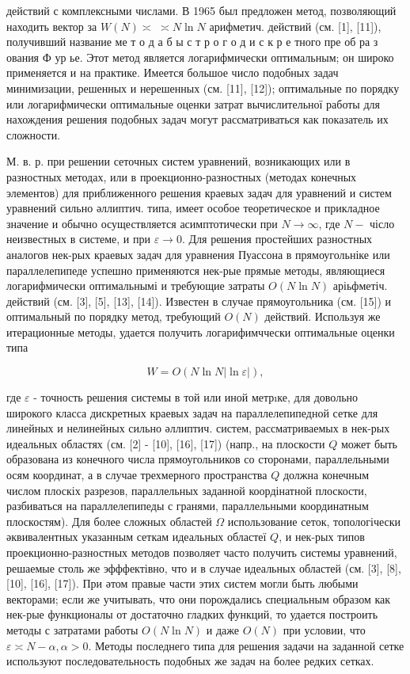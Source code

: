 \documentclass[10pt]{article}
\begin{document}
действий с комплексными числами. В 1965 был предложен метод, позволяющий находить вектор за $W(N) \asymp$ $\asymp N \ln N$ арифметич. действий (см. [1], [11]), получивший название ме т о д а б ы с т р о г о д и с к р е тного пре об ра з ования Ф ур ье. Этот метод является логарифмически оптимальным; он широко применяется и на практике. Имеется большое число подобных задач минимизации, решенных и нерешенных (см. [11], [12]); оптимальные по порядку или логарифмически оптимальные оценки затрат вычислительної работы для нахождения решения подобных задач могут рассматриваться как показатель их сложности.



М. в. р. при решении сеточных систем уравнений, возникающих или в разностных методах, или в проекционно-разностных (методах конечных элементов) для приближенного решения краевых задач для уравнений и систем уравнений сильно әллиптич. типа, имеет особое теоретическое и прикладное значение и обычно осуществляется асимптотически при $N \rightarrow \infty$, где $N-$ чісло неизвестных в системе, и при $\varepsilon \rightarrow 0$. Для решения простейших разностных аналогов нек-рых краевых задач для уравнения Пуассона в прямоугольніке или параллелепипеде успешно применяются нек-рые прямые методы, являющиеся логарифмически оптимальнымі и требующие затраты $O(N \ln N)$ аріьфметіч. действий (см. [3], [5], [13], [14]). Известен в случае прямоугольника (см. [15]) и оптимальный по порядку метод, требующий $O(N)$ действий. Используя же итерационные методы, удается получить логарифимччески оптимальные оценки типа



\[

W=O(N \ln N|\ln \varepsilon|),

\]



где $\varepsilon$ - точность решения системы в той или иной метрıке, для довольно широкого класса дискретных краевых задач на параллелепипедной сетке для линейных и нелинейных сильно әллиптич. систем, рассматриваемых в нек-рых идеальных областях (см. [2] - [10], [16], [17]) (напр., на плоскости $Q$ может быть образована из конечного числа прямоугольников со сторонами, параллельными осям координат, а в случае трехмерного пространства $Q$ должна конечным числом плоскіх разрезов, параллельных заданной коордінатной плоскости, разбиваться на параллелепипеды с гранями, параллельными координатным плоскостям). Для более сложных областей $\Omega$ использование сеток, топологічески әквивалентных указанным сеткам идеальных областеї $Q$, и нек-рых типов проекционно-разностных методов позволяет часто получить системы уравнений, решаемые столь же эфффектівно, что и в случае идеальных областей (см. [3], [8], [10], [16], [17]). При әтом правые части этих систем могли быть любыми векторами; если же учитывать, что они порождались специальным образом как нек-рые функционалы от достаточно гладких функций, то удается построить методы с затратами работы $O(N \ln N)$ и даже $O(N)$ при условии, что $\varepsilon \asymp N-\alpha, \alpha>0$. Методы последнего типа для решения задачи на заданной сетке используют последовательность подобных же задач на более редких сетках.
\end{document}
